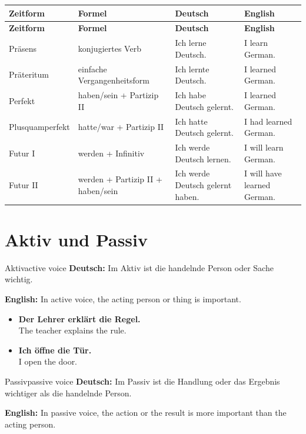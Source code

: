\documentclass[a4paper,11pt]{article}
\newcommand{\GermanText}[1]{\textbf{Deutsch: }#1\par}
\newcommand{\EnglishText}[1]{{\small\color{SoftGray}\textbf{English: }#1\par}}
\newcommand{\ExampleItem}[2]{\item \textbf{#1}\\{\small\color{SoftGray}#2}}
\begin{document}
\begin{longtable}{L{3.2cm}L{4.8cm}L{4.8cm}L{3.6cm}}
\color{white}\textbf{Zeitform} & \color{white}\textbf{Formel} & \color{white}\textbf{Deutsch} & \color{white}\textbf{English} \\
\endfirsthead
{}
\color{white}\textbf{Zeitform} & \color{white}\textbf{Formel} & \color{white}\textbf{Deutsch} & \color{white}\textbf{English} \\
\endhead
Präsens & konjugiertes Verb & Ich lerne Deutsch. & I learn German. \\
Präteritum & einfache Vergangenheitsform & Ich lernte Deutsch. & I learned German. \\
Perfekt & haben/sein + Partizip II & Ich habe Deutsch gelernt. & I learned German. \\
Plusquamperfekt & hatte/war + Partizip II & Ich hatte Deutsch gelernt. & I had learned German. \\
Futur I & werden + Infinitiv & Ich werde Deutsch lernen. & I will learn German. \\
Futur II & werden + Partizip II + haben/sein & Ich werde Deutsch gelernt haben. & I will have learned German. \\
\end{longtable}

\section{Aktiv und Passiv}

\begin{grammarentry}{Aktiv}{active voice}
\GermanText{Im Aktiv ist die handelnde Person oder Sache wichtig.}
\EnglishText{In active voice, the acting person or thing is important.}

\begin{exbox}
\begin{itemize}
    \ExampleItem{Der Lehrer erklärt die Regel.}{The teacher explains the rule.}
    \ExampleItem{Ich öffne die Tür.}{I open the door.}
\end{itemize}
\end{exbox}
\end{grammarentry}

\begin{grammarentry}{Passiv}{passive voice}
\GermanText{Im Passiv ist die Handlung oder das Ergebnis wichtiger als die handelnde Person.}
\EnglishText{In passive voice, the action or the result is more important than the acting person.}
\end{grammarentry}
\end{document}
